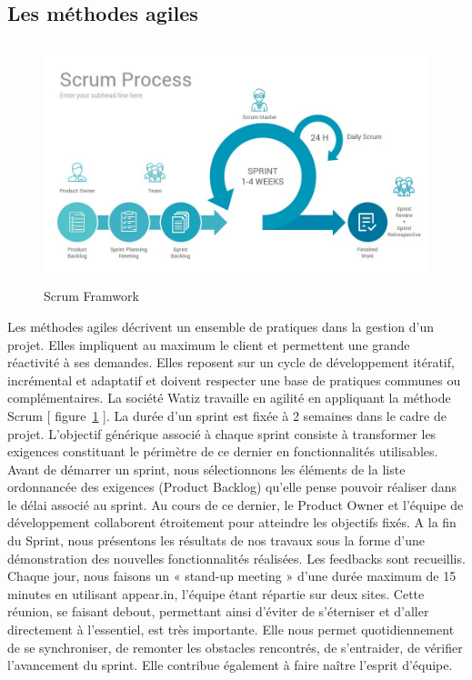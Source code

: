 \documentclass[a4paper, 12pt]{report}
\begin{document}
\subsection{Les méthodes agiles }
\begin{figure}[!ht]
\begin{center}
\includegraphics[height=7cm]{images/Scrum-Process.jpg}
\caption{Scrum Framwork}
\label{fig:3.1}
\end{center}
\end{figure}
Les méthodes agiles décrivent un ensemble de pratiques dans la gestion d’un projet. Elles impliquent au maximum le client et permettent une grande réactivité à ses demandes. Elles reposent sur un cycle de développement itératif, incrémental et adaptatif et doivent respecter une base de pratiques communes ou complémentaires.
La société Watiz travaille  en agilité en appliquant la méthode Scrum [ figure~\ref{fig:3.1} ].
La durée d’un sprint est fixée à 2 semaines dans le cadre de projet. L’objectif générique associé à chaque sprint consiste à transformer les exigences constituant le périmètre de ce dernier en fonctionnalités utilisables.
Avant de démarrer un sprint, nous sélectionnons les éléments de la liste ordonnancée des exigences (Product Backlog) qu’elle pense pouvoir réaliser dans le délai associé au sprint. Au cours de ce dernier, le Product Owner et l’équipe de développement collaborent étroitement pour atteindre les objectifs fixés. 
A la fin du Sprint, nous présentons les résultats de nos travaux sous la forme d’une démonstration des nouvelles fonctionnalités réalisées. Les feedbacks sont recueillis.
Chaque jour, nous faisons un « stand-up meeting » d'une durée maximum de 15 minutes en utilisant appear.in, l'équipe étant répartie sur deux sites.
Cette réunion, se faisant debout, permettant ainsi d'éviter de s’éterniser et d'aller directement à l'essentiel, est très importante. Elle nous permet quotidiennement de se synchroniser, de remonter les obstacles rencontrés, de s’entraider, de vérifier l’avancement du sprint. Elle contribue également à faire naître l’esprit d’équipe.
\end{document}
